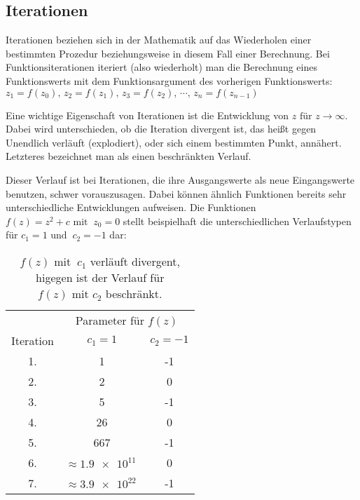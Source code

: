 \subsection{Iterationen}\label{subsec:iterations}

Iterationen beziehen sich in der Mathematik auf das Wiederholen einer bestimmten
Prozedur beziehungsweise in diesem Fall einer Berechnung.
Bei Funktionsiterationen iteriert (also wiederholt) man die Berechnung eines
Funktionswerts mit dem Funktionsargument des vorherigen Funktionswerts:
\(z_1 = f(z_0),\, z_2 = f(z_1),\, z_3 = f(z_2),\, \cdots,\, z_n = f(z_{n-1})\)

Eine wichtige Eigenschaft von
Iterationen ist die Entwicklung von \(z \text{ für } z \to \infty\).
Dabei wird unterschieden, ob die Iteration divergent ist,
das heißt gegen Unendlich verl\"auft (\glqq explodiert\grqq),
oder sich einem bestimmten Punkt, ann\"ahert.
Letzteres bezeichnet man als einen beschränkten Verlauf.

Dieser Verlauf ist bei Iterationen, die ihre Ausgangswerte als neue Eingangswerte
benutzen, schwer vorauszusagen.
Dabei k\"onnen \"ahnlich Funktionen bereits sehr unterschiedliche Entwicklungen aufweisen.
Die Funktionen \(f(z) = z^2 + c \text{ mit }\ z_0 = 0\) stellt beispielhaft
die unterschiedlichen Verlaufstypen für \(c_1 = 1 \text{ und }\ c_2 = -1\) dar:

\begin{table}[h!]\label{tab:iterations-example}
  \centering
  \begin{tabular}{@{}ccc@{}}
    \toprule
    & \multicolumn{2}{c}{Parameter für \(f(z)\)} \\
    \cmidrule(lr){2-3}
    Iteration & \( c_1 = 1\) & \( c_2 = -1\) \\
    \midrule
    1. & 1 & -1 \\
    2. & 2 & 0 \\
    3. & 5 & -1 \\
    4. & 26 & 0 \\
    5. & 667 & -1 \\
    6. & \(\approx \num{1,9e11}\ \) & 0 \\
    7. & \(\approx \num{3,9e22}\ \) & -1 \\
    \bottomrule
  \end{tabular}
  \caption{
    \(f(z) \text{ mit }\ c_1\) verl\"auft divergent,
    higegen ist der Verlauf f\"ur \(f(z) \text{ mit } c_2\) beschr\"ankt.
  }
\end{table}